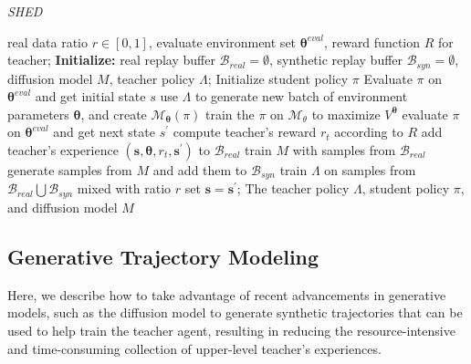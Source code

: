 \documentclass{article}
\newcommand\algo{\emph{SHED }}
\newcommand\vs{\bm{s}}
\begin{document}
\begin{algorithm}[ht]
\caption{\algo}
\label{alg}
\begin{algorithmic}[1]
\REQUIRE 
   real data ratio $r\in [0,1]$, evaluate environment set $\bm{\theta}^{eval}$, reward function $R$ for teacher; 
\STATE \textbf{Initialize:} real replay buffer $\bm{\mathcal{B}}_{real}=\emptyset$, synthetic replay buffer $\bm{\mathcal{B}}_{syn}=\emptyset$, diffusion model $M$, teacher policy $\Lambda$;
\STATE Initialize student policy $\pi$
\STATE Evaluate $\pi$ on $\bm{\theta}^{eval}$ and get initial state $s$
    \STATE use $\Lambda$ to generate new batch of environment parameters $\bm{\theta}$, and create $\mathcal{M}_{\bm{\theta}}(\pi)$
    \STATE train the $\pi$ on $\mathcal{M}_{\theta}$ to maximize $V^{\bm{\theta}}$
    \STATE evaluate $\pi$ on $\bm{\theta}^{eval}$ and get next state $s^\prime$
    \STATE compute teacher's reward $r_t$ according to $R$
    \STATE add teacher's experience $(\vs,\bm{\theta}, r_t,\vs^\prime)$ to $\bm{\mathcal{B}}_{real}$
    \STATE train $M$ with samples from $\bm{\mathcal{B}}_{real}$ 
    \STATE generate samples from $M$ and add them to $\bm{\mathcal{B}}_{syn}$
    \STATE train $\Lambda$ on samples from $\bm{\mathcal{B}}_{real} \bigcup \bm{\mathcal{B}}_{syn}$ mixed with ratio $r$
    \STATE set $\vs= \vs^\prime$;
\ENDFOR
\ENDFOR
\ENSURE The teacher policy $\Lambda$, student policy $\pi$, and diffusion model $M$
\end{algorithmic}
\end{algorithm}





\subsection{Generative Trajectory Modeling}
Here, we describe how to take advantage of recent advancements in generative models, such as the diffusion model to generate synthetic trajectories that can be used to help train the teacher agent, resulting in reducing the resource-intensive and time-consuming collection of upper-level teacher's experiences.
\end{document}
